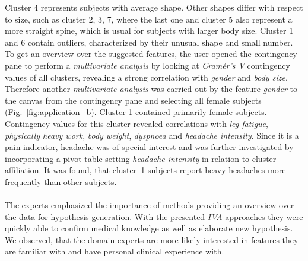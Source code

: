 \documentclass[journal]{style/vgtc} 			          %
\newcommand{\add}[1]{\textcolor{blue}{\uline{#1}}}
\newcommand{\com}[1]{\textcolor{orange}{\uline{#1}}}
\begin{document}
Cluster 4 represents subjects with average shape.
%
Other shapes differ with respect to size, such as cluster 2, 3, 7, where the last one and cluster 5 also represent a more straight spine, which is usual for subjects with larger body size.
%
Cluster 1 and 6 contain outliers, characterized by their unusual shape and small number.
%
%
To get an overview over the suggested features, the user opened the contingency pane to perform a \emph{multivariate analysis} by looking at \emph{Cram\'{e}r's V} contingency values of all clusters, revealing a strong correlation with \emph{gender} and \emph{body size}.
%
Therefore another \emph{multivariate analysis} was carried out by the feature \emph{gender} to the canvas from the contingency pane and selecting all female subjects (Fig.~\ref{fig:application}~b).
%
Cluster 1 contained primarily female subjects.
%
Contingency values for this cluster revealed correlations with \emph{leg fatigue}, \emph{physically heavy work}, \emph{body weight}, \emph{dyspnoea} and \emph{headache intensity}.
%
%
Since it is a pain indicator, headache was of special interest and was further investigated by incorporating a pivot table setting \emph{headache intensity} in relation to cluster affiliation.
%
It was found, that cluster~1 subjects report heavy headaches more frequently than other subjects.
%
%
%
%
\\\\
The experts emphasized the importance of methods providing an overview over the data for hypothesis generation.
%
With the presented \emph{IVA} approaches they were quickly able to confirm medical knowledge as well as elaborate new hypothesis.
%
We observed, that the domain experts are more likely interested in features they are familiar with and have personal clinical experience with.
\end{document}
